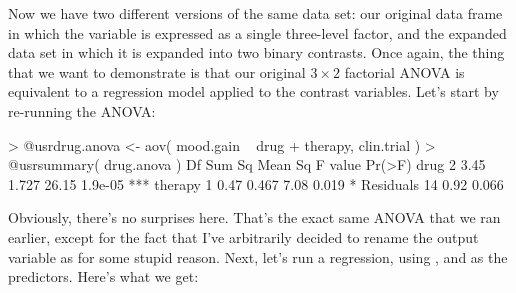 
Now we have two different versions of the same data set: our original data frame  in which the  variable is expressed as a single three-level factor, and the expanded data set  in which it is expanded into two binary contrasts. Once again, the thing that we want to demonstrate is that our original $3 \times 2$ factorial ANOVA is equivalent to a regression model applied to the contrast variables. Let's start by re-running the ANOVA:
\begin{rblock1}
> @usr{drug.anova <- aov( mood.gain ~ drug + therapy, clin.trial )}
> @usr{summary( drug.anova )}
            Df Sum Sq Mean Sq F value  Pr(>F)    
drug         2   3.45   1.727   26.15 1.9e-05 ***
therapy      1   0.47   0.467    7.08   0.019 *  
Residuals   14   0.92   0.066  
\end{rblock1}
Obviously, there's no surprises here. That's the exact same ANOVA that we ran earlier, except for the fact that I've arbitrarily decided to rename the output variable as  for some stupid reason. Next, let's run a regression, using ,  and  as the predictors. Here's what we get:

